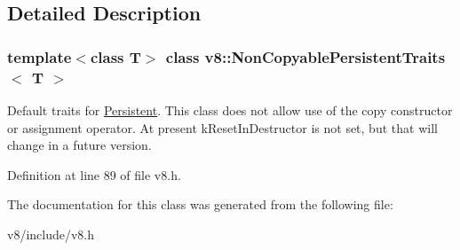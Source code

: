 \subsection{Detailed Description}
\subsubsection*{template$<$class T$>$\newline
class v8\+::\+Non\+Copyable\+Persistent\+Traits$<$ T $>$}

Default traits for \mbox{\hyperlink{classv8_1_1Persistent}{Persistent}}. This class does not allow use of the copy constructor or assignment operator. At present k\+Reset\+In\+Destructor is not set, but that will change in a future version. 

Definition at line 89 of file v8.\+h.



The documentation for this class was generated from the following file\+:\begin{DoxyCompactItemize}
\item 
v8/include/v8.\+h\end{DoxyCompactItemize}
